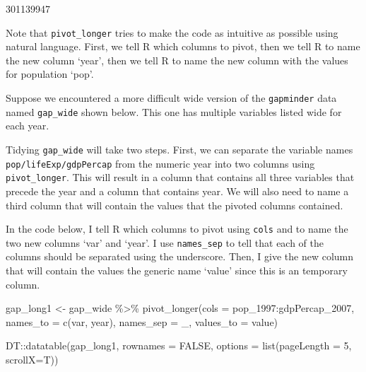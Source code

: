 \documentclass[
]{book}
\makeatletter
\newenvironment{Shaded}{\begin{snugshade}}{\end{snugshade}}
\newcommand{\AttributeTok}[1]{\textcolor[rgb]{0.61,0.61,0.61}{#1}}
\newcommand{\ConstantTok}[1]{\textcolor[rgb]{0,0,0}{#1}}
\newcommand{\DecValTok}[1]{\textcolor[rgb]{0.06,0.06,0.06}{#1}}
\newcommand{\FunctionTok}[1]{\textcolor[rgb]{0,0,0}{#1}}
\newcommand{\NormalTok}[1]{#1}
\newcommand{\OtherTok}[1]{\textcolor[rgb]{0.37,0.37,0.37}{#1}}
\newcommand{\SpecialCharTok}[1]{\textcolor[rgb]{0,0,0}{#1}}
\newcommand{\StringTok}[1]{\textcolor[rgb]{0.5,0.5,0.5}{#1}}
\newenvironment{kframe}{%
\medskip{}
\setlength{\fboxsep}{.8em}
 \def\at@end@of@kframe{}%
 \ifinner\ifhmode%
  \def\at@end@of@kframe{\end{minipage}}%
  \begin{minipage}{\columnwidth}%
 \fi\fi%
 \def\FrameCommand##1{\hskip\@totalleftmargin \hskip-\fboxsep
 \colorbox{shadecolor}{##1}\hskip-\fboxsep
     \hskip-\linewidth \hskip-\@totalleftmargin \hskip\columnwidth}%
 \MakeFramed {\advance\hsize-\width
   \@totalleftmargin\z@ \linewidth\hsize
   \@setminipage}}%
 {\par\unskip\endMakeFramed%
 \at@end@of@kframe}
\renewenvironment{Shaded}{\begin{kframe}}{\end{kframe}}
\makeatother
\begin{document}
301139947

Note that \texttt{pivot\_longer} tries to make the code as intuitive as possible using natural language. First, we tell R which columns to pivot, then we tell R to name the new column `year', then we tell R to name the new column with the values for population `pop'.

Suppose we encountered a more difficult wide version of the \texttt{gapminder} data named \texttt{gap\_wide} shown below. This one has multiple variables listed wide for each year.

\hypertarget{htmlwidget-5b9a6b2b38f01f96e463}{}

Tidying \texttt{gap\_wide} will take two steps. First, we can separate the variable names \texttt{pop/lifeExp/gdpPercap} from the numeric year into two columns using \texttt{pivot\_longer}. This will result in a column that contains all three variables that precede the year and a column that contains year. We will also need to name a third column that will contain the values that the pivoted columns contained.

In the code below, I tell R which columns to pivot using \texttt{cols} and to name the two new columns `var' and `year'. I use \texttt{names\_sep} to tell that each of the columns should be separated using the underscore. Then, I give the new column that will contain the values the generic name `value' since this is an temporary column.

\begin{Shaded}
\begin{Highlighting}[]
\NormalTok{gap\_long1 }\OtherTok{\textless{}{-}}\NormalTok{ gap\_wide }\SpecialCharTok{\%\textgreater{}\%} 
  \FunctionTok{pivot\_longer}\NormalTok{(}\AttributeTok{cols =}\NormalTok{ pop\_1997}\SpecialCharTok{:}\NormalTok{gdpPercap\_2007,}
               \AttributeTok{names\_to =} \FunctionTok{c}\NormalTok{(}\StringTok{\textquotesingle{}var\textquotesingle{}}\NormalTok{, }\StringTok{\textquotesingle{}year\textquotesingle{}}\NormalTok{),}
               \AttributeTok{names\_sep =} \StringTok{\textquotesingle{}\_\textquotesingle{}}\NormalTok{,}
               \AttributeTok{values\_to =} \StringTok{\textquotesingle{}value\textquotesingle{}}\NormalTok{)}

\NormalTok{DT}\SpecialCharTok{::}\FunctionTok{datatable}\NormalTok{(gap\_long1, }\AttributeTok{rownames =} \ConstantTok{FALSE}\NormalTok{, }\AttributeTok{options =} \FunctionTok{list}\NormalTok{(}\AttributeTok{pageLength =} \DecValTok{5}\NormalTok{, }\AttributeTok{scrollX=}\NormalTok{T))}
\end{Highlighting}
\end{Shaded}
\end{document}
